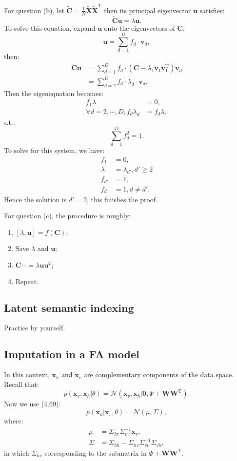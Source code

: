 \documentclass[UTF8]{ctexart}
\begin{document}
For question (b), let $\tilde{\textbf{C}}=\frac{1}{N}\tilde{\textbf{X}}\tilde{\textbf{X}}^{\text{T}}$ then its principal eigenvector $\textbf{u}$ satisfies:
$$\tilde{\textbf{C}}\textbf{u}=\lambda \textbf{u}.$$
To solve this equation, expand $\textbf{u}$ onto the eigenvectors of $\textbf{C}$:
$$\textbf{u}=\sum_{d=1}^{D}f_{d}\cdot \textbf{v}_{d},$$
then:
$$
\begin{aligned}
\tilde{\textbf{C}}\textbf{u}&=\sum_{d=1}^{D}f_{d}\cdot\left(\textbf{C}-\lambda_{1}\textbf{v}_{1}\textbf{v}_{1}^{\text{T}} \right)\textbf{v}_{d}\\
&=\sum_{d=2}^{D}f_{d}\cdot\lambda_{d}\cdot\textbf{v}_{d}.
\end{aligned}
$$
Then the eigenequation becomes:
$$
\begin{aligned}
f_{1}\lambda&=0,\\
\forall d=2,\cdots,D,f_{d}\lambda_{d}&=f_{d}\lambda,
\end{aligned}
$$
s.t.:
$$\sum_{d=1}^{D}f_{d}^{2}=1.$$
To solve for this system, we have:
$$
\begin{aligned}
f_{1}&=0,\\
\lambda&=\lambda_{d'},d'\geq 2\\
f_{d'}&=1,\\
f_{d}&=1,d\neq d'.
\end{aligned}
$$
Hence the solution is $d'=2$, this finishes the proof.

For question (c), the procedure is roughly:
\begin{enumerate}
\item $[\lambda,\textbf{u}]=f(\textbf{C})$;
\item Save $\lambda$ and $\textbf{u}$;
\item $\textbf{C}-=\lambda\textbf{u}\textbf{u}^{T}$;
\item Repeat.
\end{enumerate}


\subsection{Latent semantic indexing}
Practice by yourself.

\subsection{Imputation in a FA model}
In this context, $\textbf{x}_{h}$ and $\textbf{x}_{v}$ are complementary components of the data space.
Recall that:
$$p(\textbf{x}_{v},\textbf{x}_{h}|\theta)=\mathcal{N}(\textbf{x}_{v},\textbf{x}_{h}|\textbf{0},\Psi+\textbf{W}\textbf{W}^{\text{T}}).$$
Now we use (4.69):
$$p(\textbf{x}_{h}|\textbf{x}_{v},\theta)=\mathcal{N}(\mu,\Sigma),$$
where:
$$
\begin{aligned}
\mu&=\Sigma_{hv}\Sigma^{-1}_{vv}\textbf{x}_{v},\\
\Sigma&=\Sigma_{hh}-\Sigma_{hv}\Sigma_{vv}^{-1}\Sigma_{vh},
\end{aligned}
$$
in which $\Sigma_{hv}$ corresponding to the submatrix in $\Psi+\textbf{W}\textbf{W}^{\text{T}}$.
\end{document}
